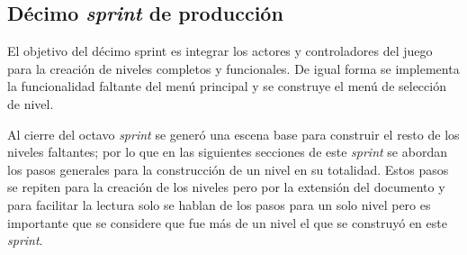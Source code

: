 \subsection{Décimo \textit{sprint} de producción}
El objetivo del décimo sprint es integrar los actores y controladores del juego 
para la creación de niveles completos y funcionales. De igual forma se 
implementa la funcionalidad faltante del menú principal y se construye el menú 
de selección de nivel.
\\
\par
Al cierre del octavo \textit{sprint} se generó una escena base para construir el 
resto de los niveles faltantes; por lo que en las siguientes secciones de este 
\textit{sprint} se abordan los pasos generales para la construcción de un nivel 
en su totalidad. Estos pasos se repiten para la creación de los niveles pero por 
la extensión del documento y para facilitar la lectura solo se hablan de los 
pasos para un solo nivel pero es importante que se considere que fue más de un 
nivel el que se construyó en este \textit{sprint}. 


